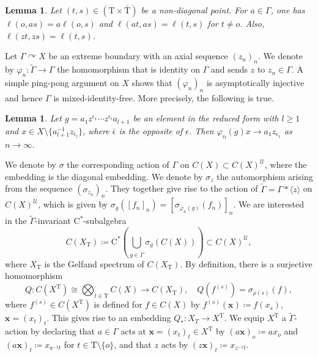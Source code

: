 \documentclass[12pt,nosumlimits,nonamelimits]{amsart}
\newtheorem{lem}[thm]{Lemma}
\theoremstyle{remark}
\theoremstyle{definition}
\newcommand{\cU}{\mathcal{U}}
\newcommand{\vp}{\varphi}
\newcommand{\Ga}{\Gamma}
\newcommand{\Tree}{\mathrm{T}}
\newcommand{\acts}{\curvearrowright}
\newcommand{\ip}[1]{\mathopen{\langle}#1\mathclose{\rangle}}
\begin{document}
%
\begin{lem}\label{lem:labelequiv}
Let $(t,s)\in (\Tree\times\bar{\Tree})$ 
be a non-diagonal point. 
For $a\in\Ga$, one has $\ell(o,as)=a\ell(o,s)$ 
and $\ell(at,as) = \ell(t,s)$ for $t\neq o$. 
Also, $\ell(zt,zs)=\ell(t,s)$. 
\end{lem}

Let $\Ga\acts X$ be an extreme boundary 
with an axial sequence $(z_n)_n$. 
We denote by $\vp_n\colon\tilde{\Ga}\to\Ga$ the homomorphism 
that is identity on $\Ga$ and sends $z$ to $z_n\in\Ga$. 
A simple ping-pong argument on $X$ shows that $(\vp_n)_n$ 
is asymptotically injective and hence $\Ga$ is mixed-identity-free. 
More precisely, the following is true. 

%
\begin{lem}\label{lem:pingpong}
Let $g=a_1z^{\epsilon_1} \cdots z^{\epsilon_l}a_{l+1}$ 
be an element in the reduced form with $l\geq1$ 
and $x\in X \setminus\{a_{l+1}^{-1} z_{\bar{\epsilon}_l}\}$, 
where $\bar{\epsilon}$ is the opposite of $\epsilon$. 
Then $\vp_n(g) x \to a_1z_{\epsilon_1}$ as $n\to\infty$.
\end{lem}

We denote by $\sigma$ the corresponding action of $\Ga$ 
on $C(X) \subset C(X)^\cU$, where the embedding 
is the diagonal embedding.
We denote by $\sigma_z$ the automorphism 
arising from the sequence $(\sigma_{z_n})_n$.
They together give rise to the action 
of $\tilde{\Ga}=\Ga*\ip{z}$ on $C(X)^\cU$, 
which is given by
$\sigma_g([f_n]_n) = [\sigma_{\vp_n(g)}(f_n)]_n$.
We are interested in the $\tilde{\Ga}$-invariant 
$\mathrm{C}^*$-subalgebra 
\[
C(X_\Tree) \coloneq \mathrm{C}^*( \bigcup_{g\in\tilde{\Ga}} \sigma_g( C(X) ) ) \subset C(X)^\cU,
\] 
where $X_\Tree$ is the Gelfand spectrum of $C(X_\Tree)$.
By definition, there is a surjective homomorphism 
\[
Q\colon C(X^\Tree) \cong \bigotimes_{t\in\Tree} C(X)
 \to C(X_\Tree),\quad Q(f^{(s)}) = \sigma_{\rho(s)}(f),
\]
where $f^{(s)}\in C(X^\Tree)$ 
is defined for $f\in C(X)$ 
by $f^{(s)}(\mathbf{x}) \coloneq f(x_s)$, 
$\mathbf{x}=(x_t)_t$. 
This gives rise to an embedding 
$Q_*\colon X_T\to X^\Tree$.
We equip $X^\Tree$ a $\tilde{\Ga}$-action by 
declaring that $a\in\Ga$ acts at $\mathbf{x}=(x_t)_t\in X^\Tree$ 
by $( a \mathbf{x} )_o \coloneq ax_o$ 
and $(a\mathbf{x})_t \coloneq x_{a^{-1}t}$ for $t\in\Tree\setminus\{o\}$, 
and that $z$ acts by $(z\mathbf{x})_t \coloneq x_{z^{-1}t}$. 
\end{document}
